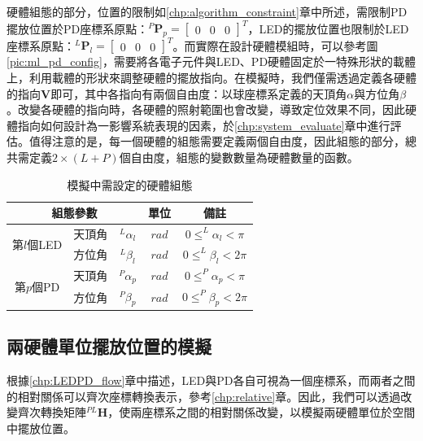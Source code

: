 硬體組態的部分，位置的限制如\ref{chp:algorithm_constraint}章中所述，需限制PD擺放位置於PD座標系原點：$^P\boldsymbol{P}_p=
\left[\begin{array}{ccc}0&0&0\end{array}\right]^T$，LED的擺放位置也限制於LED座標系原點：$^L\boldsymbol{P}_l=
\left[\begin{array}{ccc}0&0&0\end{array}\right]^T$。而實際在設計硬體模組時，可以參考圖\ref{pic:ml_pd_config}，需要將各電子元件與LED、PD硬體固定於一特殊形狀的載體上，利用載體的形狀來調整硬體的擺放指向。在模擬時，我們僅需透過定義各硬體的指向$\boldsymbol{V}$即可，其中各指向有兩個自由度：以球座標系定義的天頂角$\alpha$與方位角$\beta$。改變各硬體的指向時，各硬體的照射範圍也會改變，導致定位效果不同，因此硬體指向如何設計為一影響系統表現的因素，於\ref{chp:system_evaluate}章中進行評估。值得注意的是，每一個硬體的組態需要定義兩個自由度，因此組態的部分，總共需定義$2\times(L+P)$個自由度，組態的變數數量為硬體數量的函數。

\begin{table}[h]
    \renewcommand{\arraystretch}{1.3}
    \setlength{\arrayrulewidth}{0.15mm}
    \setlength{\doublerulesep}{0.12mm}
    \caption{模擬中需設定的硬體組態}
    \label{tab:para_config}
    \centering
    \begin{tabular}{|c|cc|c|c|}
    \hline
    \multicolumn{3}{|c|}{\textbf{組態參數}}  &\textbf{單位}  &  \textbf{備註}   \\
    \hline
    \multirow{2}{*}{第$l$個LED} 
    & 天頂角 &$^L \alpha_l$ & $rad$ & $0\leq ^L \alpha_l<\pi$ \\
     & 方位角& $^L \beta_l$& $rad$ & $0\leq ^L \beta_l<2\pi$ \\\hline
    \multirow{2}{*}{第$p$個PD} 
    & 天頂角 &$^P \alpha_p$ & $rad$ & $0\leq ^P \alpha_p<\pi$ \\
    & 方位角& $^P \beta_p$& $rad$ & $0\leq ^P \beta_p<2\pi$ \\\hline
    \end{tabular}
    \end{table}
    

\subsection{兩硬體單位擺放位置的模擬}
\label{chp:simulate_position}



根據\ref{chp:LEDPD_flow}章中描述，LED與PD各自可視為一個座標系，而兩者之間的相對關係可以齊次座標轉換表示，參考\ref{chp:relative}章。因此，我們可以透過改變齊次轉換矩陣$^{PL}\boldsymbol{H}$，使兩座標系之間的相對關係改變，以模擬兩硬體單位於空間中擺放位置。

